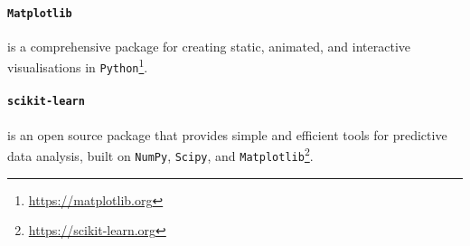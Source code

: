 \paragraph*{\texttt{Matplotlib}} is a comprehensive package for creating static, animated, and interactive visualisations in \texttt{Python}\footnote{\url{https://matplotlib.org}}. 

\paragraph*{\texttt{scikit-learn}} is an open source package that provides simple and efficient tools for predictive data analysis, built on \texttt{NumPy}, \texttt{Scipy}, and \texttt{Matplotlib}\footnote{\url{https://scikit-learn.org}}.